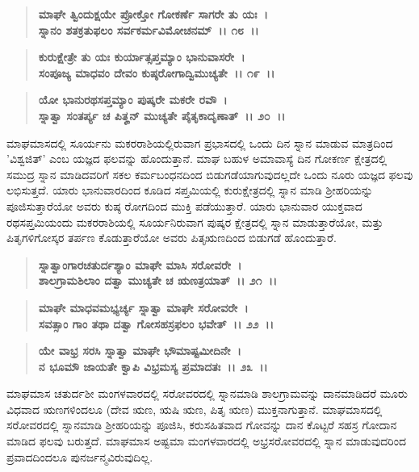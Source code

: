 \begin{verse}
\textbf{ಮಾಘೇ ತ್ವಿಂದುಕ್ಷಯೇ ಪ್ರೋಕ್ತೋ ಗೋಕರ್ಣೆ ಸಾಗರೇ ತು ಯಃ~।}\\\textbf{ಸ್ನಾನಂ ಶತಕ್ರತುಫಲಂ ಸರ್ವಕರ್ಮವಿಮೋಚನಮ್~।। ೧೮~।। }
\end{verse}

\begin{verse}
\textbf{ಕುರುಕ್ಷೇತ್ರೇ ತು ಯಃ ಕುರ್ಯಾತ್ಸಪ್ತಮ್ಯಾಂ ಭಾನುವಾಸರೇ~।}\\\textbf{ಸಂಪೂಜ್ಯ ಮಾಧವಂ ದೇವಂ ಕುಷ್ಠರೋಗಾದ್ವಿಮುಚ್ಯತೇ~।। ೧೯~।।} 
\end{verse}

\begin{verse}
\textbf{ಯೋ ಭಾನುರಥಸಪ್ತಮ್ಯಾಂ ಪುಷ್ಕರೇ ಮಕರೇ ರವೌ~।}\\\textbf{ಸ್ನಾತ್ವಾ ಸಂತರ್ಪ್ಯ ಚ ಪಿತೄನ್ ಮುಚ್ಯತೇ ಪೈತೃಕಾದೃಣಾತ್~।। ೨೦~।।}
\end{verse}

ಮಾಘಮಾಸದಲ್ಲಿ ಸೂರ್ಯನು ಮಕರರಾಶಿಯಲ್ಲಿರುವಾಗ ಪ್ರಭಾಸದಲ್ಲಿ ಒಂದು ದಿನ ಸ್ನಾನ ಮಾಡುವ ಮಾತ್ರದಿಂದ 'ವಿಶ್ವಜಿತ್' ಎಂಬ ಯಜ್ಞದ ಫಲವನ್ನು ಹೊಂದುತ್ತಾನೆ. ಮಾಘ ಬಹುಳ ಅಮಾವಾಸ್ಯೆ ದಿನ ಗೋಕರ್ಣ ಕ್ಷೇತ್ರದಲ್ಲಿ ಸಮುದ್ರ ಸ್ನಾನ ಮಾಡಿದವರಿಗೆ ಸಕಲ ಕರ್ಮಬಂಧನದಿಂದ ಬಿಡುಗಡೆಯಾಗುವುದಲ್ಲದೇ ಒಂದು ನೂರು ಯಜ್ಞದ ಫಲವು ಲಭಿಸುತ್ತದೆ. ಯಾರು ಭಾನುವಾರದಿಂದ ಕೂಡಿದ ಸಪ್ತಮಿಯಲ್ಲಿ ಕುರುಕ್ಷೇತ್ರದಲ್ಲಿ ಸ್ನಾನ ಮಾಡಿ ಶ‍್ರೀಹರಿಯನ್ನು ಪೂಜಿಸುತ್ತಾರೆಯೋ ಅವರು ಕುಷ್ಠ ರೋಗದಿಂದ ಮುಕ್ತಿ ಪಡೆಯುತ್ತಾರೆ. ಯಾರು ಭಾನುವಾರ ಯುಕ್ತವಾದ ರಥಸಪ್ತಮಿಯಂದು ಮಕರರಾಶಿಯಲ್ಲಿ ಸೂರ್ಯನಿರುವಾಗ ಪುಷ್ಕರ ಕ್ಷೇತ್ರದಲ್ಲಿ ಸ್ನಾನ ಮಾಡುತ್ತಾರೆಯೋ, ಮತ್ತು ಪಿತೃಗಳಿಗೋಸ್ಕರ ತರ್ಪಣ ಕೊಡುತ್ತಾರೆಯೋ ಅವರು ಪಿತೃಋಣದಿಂದ ಬಿಡುಗಡೆ ಹೊಂದುತ್ತಾರೆ.

\begin{verse}
\textbf{ಸ್ನಾತ್ವಾಂಗಾರಚತುರ್ದಶ್ಯಾಂ ಮಾಘೇ ಮಾಸಿ ಸರೋವರೇ~।}\\\textbf{ಶಾಲಗ್ರಾಮಶಿಲಾಂ ದತ್ವಾ ಮುಚ್ಯತೇ ಚ ಋಣತ್ರಯಾತ್~।। ೨೧~।। }
\end{verse}

\begin{verse}
\textbf{ಮಾಘೇ ಮಾಧವಮಭ್ಯರ್ಚ್ಯ ಸ್ನಾತ್ವಾ ಮಾಘೇ ಸರೋವರೇ~।}\\\textbf{ಸವತ್ಸಾಂ ಗಾಂ ತಥಾ ದತ್ವಾ ಗೋಸಹಸ್ರಫಲಂ ಭವೇತ್~।। ೨೨~।।} 
\end{verse}

\begin{verse}
\textbf{ಯೇ ವಾಭ್ರ ಸರಸಿ ಸ್ನಾತ್ವಾ ಮಾಘೇ ಭೌಮಾಷ್ಟಮೀದಿನೇ~।}\\\textbf{ನ ಭೂಮೌ ಜಾಯತೇ ಕ್ವಾಪಿ ವಿಭ್ರಮಸ್ಯ ಪ್ರಮಾದತಃ~।। ೨೩~।।}
\end{verse}

ಮಾಘಮಾಸ ಚತುರ್ದಶೀ ಮಂಗಳವಾರದಲ್ಲಿ ಸರೋವರದಲ್ಲಿ ಸ್ನಾನಮಾಡಿ ಶಾಲಗ್ರಾಮವನ್ನು ದಾನಮಾಡಿದರೆ ಮೂರು ವಿಧವಾದ ಋಣಗಳಿಂದಲೂ (ದೇವ ಋಣ, ಋಷಿ ಋಣ, ಪಿತೃ ಋಣ) ಮುಕ್ತನಾಗುತ್ತಾನೆ. ಮಾಘಮಾಸದಲ್ಲಿ ಸರೋವರದಲ್ಲಿ ಸ್ನಾನಮಾಡಿ ಶ‍್ರೀಹರಿಯನ್ನು ಪೂಜಿಸಿ, ಕರುಸಹಿತವಾದ ಗೋವನ್ನು ದಾನ ಕೊಟ್ಟರೆ ಸಹಸ್ರ ಗೋದಾನ ಮಾಡಿದ ಫಲವು ಬರುತ್ತದೆ. ಮಾಘಮಾಸ ಅಷ್ಟಮಾ ಮಂಗಳವಾರದಲ್ಲಿ ಅಭ್ರಸರೋವರದಲ್ಲಿ ಸ್ನಾನ ಮಾಡುವುದರಿಂದ ಪ್ರವಾದದಿಂದಲೂ ಪುನರ್ಜನ್ಮವಿರುವುದಿಲ್ಲ.

